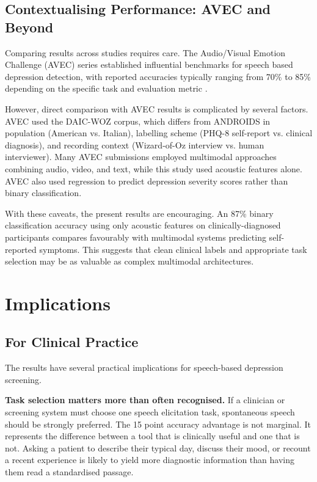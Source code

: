 \subsection{Contextualising Performance: AVEC and Beyond}

Comparing results across studies requires care. The Audio/Visual Emotion Challenge (AVEC) series established influential benchmarks for speech based depression detection, with reported accuracies typically ranging from 70\% to 85\% depending on the specific task and evaluation metric \cite{valstar2013avec, ringeval2017avec}.

However, direct comparison with AVEC results is complicated by several factors. AVEC used the DAIC-WOZ corpus, which differs from ANDROIDS in population (American vs. Italian), labelling scheme (PHQ-8 self-report vs. clinical diagnosis), and recording context (Wizard-of-Oz interview vs. human interviewer). Many AVEC submissions employed multimodal approaches combining audio, video, and text, while this study used acoustic features alone. AVEC also used regression to predict depression severity scores rather than binary classification.

With these caveats, the present results are encouraging. An 87\% binary classification accuracy using only acoustic features on clinically-diagnosed participants compares favourably with multimodal systems predicting self-reported symptoms. This suggests that clean clinical labels and appropriate task selection may be as valuable as complex multimodal architectures.

\section{Implications}

\subsection{For Clinical Practice}

The results have several practical implications for speech-based depression screening.

\textbf{Task selection matters more than often recognised.} If a clinician or screening system must choose one speech elicitation task, spontaneous speech should be strongly preferred. The 15 point accuracy advantage is not marginal. It represents the difference between a tool that is clinically useful and one that is not. Asking a patient to describe their typical day, discuss their mood, or recount a recent experience is likely to yield more diagnostic information than having them read a standardised passage.

